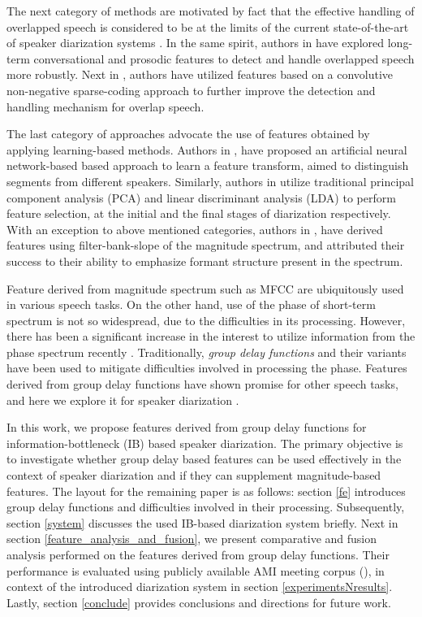 \documentclass[conference]{IEEEtran}
\begin{document}
The next category of methods are motivated by fact that the effective handling of
overlapped speech is considered to be at the limits of the current 
state-of-the-art of speaker diarization systems \cite{reviewPaper1,featOverLap}. In the same
spirit, authors in \cite{featProsody,featOverLap} have explored long-term
conversational and prosodic features to detect and handle overlapped speech more
robustly. Next in \cite{featSC}, authors have utilized features based on a convolutive non-negative sparse-coding approach to further improve the detection and handling mechanism for overlap speech. 


The last category of approaches advocate the use of features
obtained by applying learning-based methods. Authors in \cite{featANN}, have
proposed an artificial neural network-based based approach to learn a feature transform,
aimed to distinguish segments from different speakers. Similarly, authors in
\cite{featPCAnLDA} utilize traditional principal component analysis (PCA) and
linear discriminant analysis (LDA) to perform feature selection, at the initial
and the final stages of diarization respectively. With an exception to
above mentioned categories, authors in \cite{featFilterBank}, have derived
features using filter-bank-slope of the magnitude spectrum, and attributed their success to their ability to emphasize formant structure present in the spectrum. 

Feature derived from magnitude spectrum such as MFCC are ubiquitously used in various
speech tasks. On the other hand, use of the phase of short-term spectrum is not so
widespread, due to the difficulties in its processing.
However, there has been a significant increase in the interest to utilize
information from the phase spectrum recently
\cite{phaseImportantInterspeech14,gdSurvey}. Traditionally, \textit{group delay functions}
and their variants have been used to mitigate difficulties involved in
processing the phase. Features derived from
group delay functions have shown promise for other speech tasks, and here we 
explore it for speaker diarization \cite{modifiedGD,allPoleGdSid}. 

In this work, we propose features derived from group delay functions for information-bottleneck (IB)
based speaker diarization. The primary objective is to investigate whether group
delay based features can be used effectively in the context of speaker
diarization and if they can supplement magnitude-based features. The layout for
the remaining paper is as follows: section \ref{fe} introduces group delay
functions and difficulties involved in their processing. Subsequently, section
\ref{system} discusses the used IB-based diarization system briefly. Next in
section \ref{feature_analysis_and_fusion}, we present comparative
and fusion analysis performed on the features derived from group delay functions. Their
performance is evaluated using publicly available AMI meeting corpus (\cite{AMIData}), in
context of the introduced diarization system in section
\ref{experimentsNresults}. Lastly, section \ref{conclude} provides conclusions
and directions for future work.    
\end{document}

